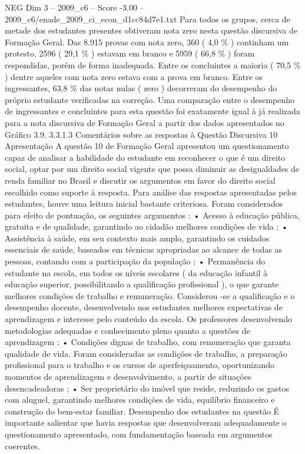 \begin{textsample}{NEG Dim 3 – 2009\_c6 – Score -3.00 – 2009\_c6/enade\_2009\_ci\_econ\_d1cc84d7e1.txt}
Para todos os grupos, cerca de metade dos estudantes presentes obtiveram nota zero nesta questão discursiva de Formação Geral.
Das 8.915 provas com nota zero, 360 ( 4,0 \% ) continham um protesto, 2596 ( 29,1 \% ) estavam em branco e 5959 ( 66,8 \% ) foram respondidas, porém de forma inadequada.
Entre os concluintes a maioria ( 70,5 \% ) dentre aqueles com nota zero estava com a prova em branco.
Entre os ingressantes, 63,8 \% das notas nulas ( zero ) decorreram do desempenho do próprio estudante verificadas na correção.
Uma comparação entre o desempenho de ingressantes e concluintes para esta questão foi exatamente igual à já realizada para a nota discursiva de Formação Geral a partir dos dados apresentados no Gráfico 3.9. 3.3.1.3 Comentários sobre as respostas à Questão Discursiva 10 Apresentação A questão 10 de Formação Geral apresentou um questionamento capaz de analisar a habilidade do estudante em reconhecer o que é um direito social, optar por um direito social vigente que possa diminuir as desigualdades de renda familiar no Brasil e discutir os argumentos em favor do direito social escolhido como suporte à resposta.
Para análise das respostas apresentadas pelos estudantes, houve uma leitura inicial bastante criteriosa.
Foram considerados para efeito de pontuação, os seguintes argumentos : • Acesso à educação pública, gratuita e de qualidade, garantindo ao cidadão melhores condições de vida ; • Assistência à saúde, em seu contexto mais amplo, garantindo os cuidados essenciais de saúde, baseados em técnicas apropriadas ao alcance de todas as pessoas, contando com a participação da população ; • Permanência do estudante na escola, em todos os níveis escolares ( da educação infantil à educação superior, possibilitando a qualificação profissional ), o que garante melhores condições de trabalho e remuneração.
Considerou -se a qualificação e o desempenho docente, desenvolvendo nos estudantes melhores expectativas de aprendizagem e interesse pelo conteúdo da escola.
Os professores desenvolvendo metodologias adequadas e conhecimento pleno quanto a questões de aprendizagem ; • Condições dignas de trabalho, com remuneração que garanta qualidade de vida.
Foram consideradas as condições de trabalho, a preparação profissional para o trabalho e os cursos de aperfeiçoamento, oportunizando momentos de aprendizagem e desenvolvimento, a partir de situações desencadeadoras ; • Ser proprietário do imóvel que reside, reduzindo os gastos com aluguel, garantindo melhores condições de vida, equilíbrio financeiro e construção do bem-estar familiar.
Desempenho dos estudantes na questão É importante salientar que havia respostas que desenvolveram adequadamente o questionamento apresentado, com fundamentação baseada em argumentos coerentes.

\end{textsample}
